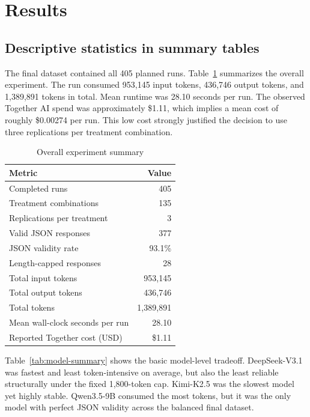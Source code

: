 \documentclass{article}
\begin{document}
\section{Results}

\subsection{Descriptive statistics in summary tables}

The final dataset contained all 405 planned runs. Table~\ref{tab:project-summary} summarizes the overall experiment. The run consumed 953{,}145 input tokens, 436{,}746 output tokens, and 1{,}389{,}891 tokens in total. Mean runtime was 28.10 seconds per run. The observed Together AI spend was approximately \$1.11, which implies a mean cost of roughly \$0.00274 per run. This low cost strongly justified the decision to use three replications per treatment combination.

\begin{table}[tbp]
\centering
\caption{Overall experiment summary}
\label{tab:project-summary}
\small
\begin{tabular}{lr}
\toprule
Metric & Value \\
\midrule
Completed runs & 405 \\
Treatment combinations & 135 \\
Replications per treatment & 3 \\
Valid JSON responses & 377 \\
JSON validity rate & 93.1\% \\
Length-capped responses & 28 \\
Total input tokens & 953{,}145 \\
Total output tokens & 436{,}746 \\
Total tokens & 1{,}389{,}891 \\
Mean wall-clock seconds per run & 28.10 \\
Reported Together cost (USD) & \$1.11 \\
\bottomrule
\end{tabular}
\end{table}

Table~\ref{tab:model-summary} shows the basic model-level tradeoff. DeepSeek-V3.1 was fastest and least token-intensive on average, but also the least reliable structurally under the fixed 1{,}800-token cap. Kimi-K2.5 was the slowest model yet highly stable. Qwen3.5-9B consumed the most tokens, but it was the only model with perfect JSON validity across the balanced final dataset.
\end{document}
